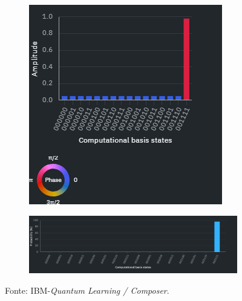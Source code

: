 \vspace{-5pt}
\begin{figure}[ht!]
    \centering
    \captionsetup{justification=centering}    
    \caption{Amplitude e probabilidades após medição final do circuito.}
    \label{fig:AmpProbFinalComposer}
    
    \begin{subfigure}{.48\textwidth}
        \centering
        \includegraphics[trim=0mm 47mm 15mm 0mm,clip,width=.7\textwidth]{Imagens/EvPsi/amplitudeFinal.png}
        \label{subfig:AmpFinalComposer}
    \end{subfigure}
    \begin{subfigure}{.48\textwidth}
        \centering
        \includegraphics[trim=0mm 0mm 17mm 0mm,clip,width=\textwidth]{Imagens/EvPsi/ProbFinal.png}
        \label{subfig:ProbFinalComposer}
    \end{subfigure}
    
    {\small Fonte: IBM-\textit{Quantum Learning / Composer}.}
\end{figure}
